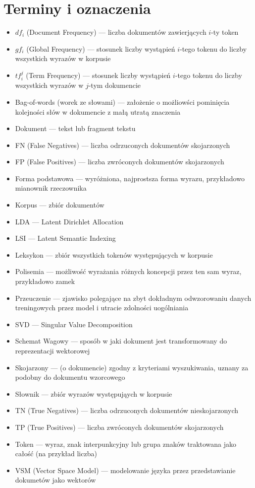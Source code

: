 \documentclass[11pt,a4paper]{article}
\begin{document}
\label{sec:summary}
\pagebreak

\appendix
\section{Terminy i oznaczenia}
\label{sec:terms}

\begin{itemize}
\item $df_i$ (Document Frequency) --- liczba dokumentów zawierjących $i$-ty token
\item $gf_i$ (Global Frequency) --- stosunek liczby wystąpień $i$-tego tokenu do liczby wszystkich wyrazów w korpusie
\item $tf_i^j$ (Term Frequency) --- stosunek liczby wystąpień $i$-tego tokenu do liczby wszystkich wyrazów w $j$-tym dokumencie
\item Bag-of-words (worek ze słowami) --- założenie o możliowści pominięcia kolejności słów w dokumencie z małą utratą znaczenia
\item Dokument --- tekst lub fragment tekstu
\item FN (False Negatives) --- liczba odrzuconych dokumentów skojarzonych
\item FP (False Positives) --- liczba zwróconych dokumentów skojarzonych
\item Forma podstawowa --- wyróżniona, najprostsza forma wyrazu, przykładowo mianownik rzeczownika
\item Korpus --- zbiór dokumentów
\item LDA --- Latent Dirichlet Allocation
\item LSI --- Latent Semantic Indexing
\item Leksykon --- zbiór wszystkich tokenów występujących w korpusie
\item Polisemia --- możliwość wyrażania różnych koncepcji przez ten sam wyraz, przykładowo zamek
\item Przeuczenie --- zjawisko polegające na zbyt dokładnym odwzorowaniu danych treningowych przez model i utracie zdolności uogólniania
\item SVD --- Singular Value Decomposition
\item Schemat Wagowy --- sposób w jaki dokument jest transformowany do reprezentacji wektorowej
\item Skojarzony --- (o dokumencie) zgodny z kryteriami wyszukiwania, uznany za podobny do dokumentu wzorcowego
\item Słownik --- zbiór wyrazów występująych w korpusie
\item TN (True Negatives) --- liczba odrzuconych dokumentów nieskojarzonych
\item TP (True Positives) --- liczba zwróconych dokumentów skojarzonych
\item Token --- wyraz, znak interpunkcyjny lub grupa znaków traktowana jako całość (na przykład liczba)
\item VSM (Vector Space Model) --- modelowanie języka przez przedstawianie dokumetów jako wektorów
\end{itemize}
\end{document}
